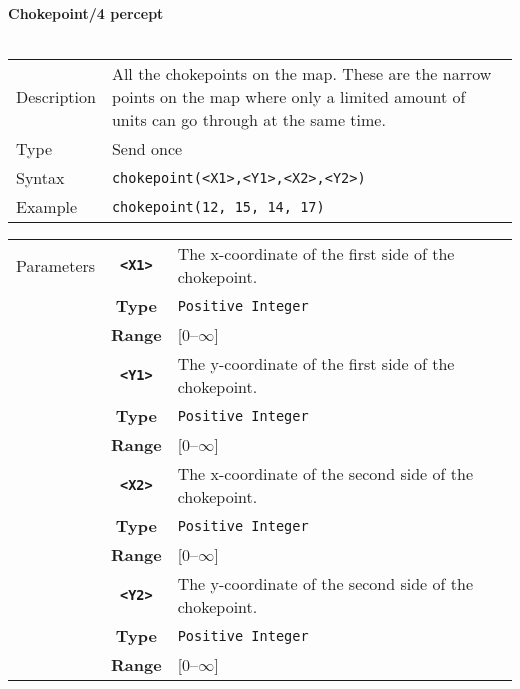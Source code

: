 \noindent
\textbf{Chokepoint/4 percept}\\
\\
\begin{tabularx}{\textwidth}{lX}
 Description & All the chokepoints on the map. These are the narrow points on the map where only a limited amount of units can go through at the same time.  \\
 Type & Send once \\
 Syntax & \verb|chokepoint(<X1>,<Y1>,<X2>,<Y2>)| \\
 Example & \verb|chokepoint(12, 15, 14, 17)| \\
 \end{tabularx}
 \begin{tabularx}{\textwidth}{l | c | p{8cm}|}
 \cline{2-3}
 Parameters & \textbf{\verb|<X1>|} & The x-coordinate of the first side of the chokepoint.\\
            & \textbf{Type} & \verb|Positive Integer| \\
            & \textbf{Range} & [0--$\infty$] \\
            \cline{2-3}
            & \textbf{\verb|<Y1>|} & The y-coordinate of the first side of the chokepoint.\\
            & \textbf{Type} & \verb|Positive Integer| \\
            & \textbf{Range} & [0--$\infty$] \\
            \cline{2-3}
            & \textbf{\verb|<X2>|} & The x-coordinate of the second side of the chokepoint.\\
            & \textbf{Type} & \verb|Positive Integer| \\
            & \textbf{Range} & [0--$\infty$] \\
            \cline{2-3}
            & \textbf{\verb|<Y2>|} & The y-coordinate of the second side of the chokepoint.\\
            & \textbf{Type} & \verb|Positive Integer| \\
            & \textbf{Range} & [0--$\infty$] \\
            \cline{2-3}
\end{tabularx}\\


